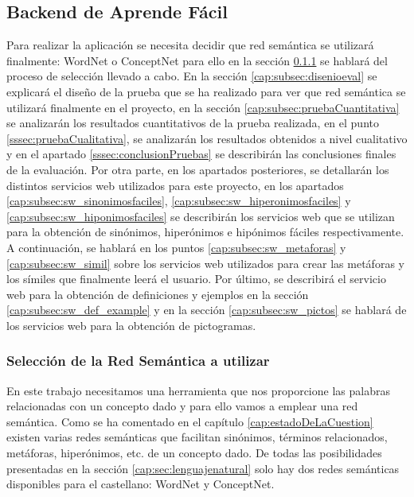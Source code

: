 \subsection{Backend de Aprende Fácil}
\label{cap:subsec:backendapp}
Para realizar la aplicación se necesita decidir que red semántica se utilizará finalmente: WordNet o ConceptNet para ello en la sección \ref{cap:subsec:redsemanticautilizada} se hablará del proceso de selección llevado a cabo. En la sección \ref{cap:subsec:disenioeval} se explicará el diseño de la prueba que se ha realizado para ver que red semántica se utilizará finalmente en el proyecto, en la sección \ref{cap:subsec:pruebaCuantitativa} se analizarán los resultados cuantitativos de la prueba realizada, en el punto \ref{sssec:pruebaCualitativa}, se analizarán los resultados obtenidos a nivel cualitativo y en el apartado \ref{sssec:conclusionPruebas} se describirán las conclusiones finales de la evaluación. Por otra parte, en los apartados posteriores, se detallarán los distintos servicios web utilizados para este proyecto, en los apartados \ref{cap:subsec:sw_sinonimosfaciles}, \ref{cap:subsec:sw_hiperonimosfaciles} y \ref{cap:subsec:sw_hiponimosfaciles} se describirán los servicios web que se utilizan para la obtención de sinónimos, hiperónimos e hipónimos fáciles respectivamente. A continuación, se hablará en los puntos \ref{cap:subsec:sw_metaforas} y \ref{cap:subsec:sw_simil} sobre los servicios web utilizados para crear las metáforas y los símiles que finalmente leerá el usuario. Por último, se describirá el servicio web para la obtención de definiciones y ejemplos en la sección \ref{cap:subsec:sw_def_example} y en la sección \ref{cap:subsec:sw_pictos} se hablará de los servicios web para la obtención de pictogramas.
\subsubsection{Selección de la Red Semántica a utilizar}
\label{cap:subsec:redsemanticautilizada}

En este trabajo necesitamos una herramienta que nos proporcione las palabras relacionadas con un concepto dado y para ello vamos a emplear una red semántica.
Como se ha comentado en el capítulo \ref{cap:estadoDeLaCuestion} existen varias redes semánticas que facilitan sinónimos, términos relacionados, metáforas, hiperónimos, etc. de un concepto dado. 
De todas las posibilidades presentadas en la sección \ref{cap:sec:lenguajenatural} solo hay dos redes semánticas disponibles para el castellano: WordNet y ConceptNet. 


